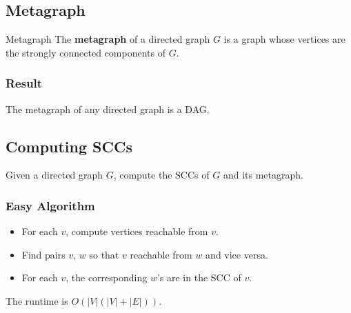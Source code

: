 \documentclass[letterpaper]{article}
\begin{document}
\subsection{Metagraph}
\begin{definition}{Metagraph}{}
    The \textbf{metagraph} of a directed graph $G$ is a graph whose vertices are the strongly connected components of $G$.
\end{definition}


\subsubsection{Result}
\begin{theorem}{}{}
    The metagraph of any directed graph is a DAG. 
\end{theorem}

\subsection{Computing SCCs}
Given a directed graph $G$, compute the SCCs of $G$ and its metagraph. 

\subsubsection{Easy Algorithm}
\begin{itemize}
    \item For each $v$, compute vertices reachable from $v$.
    \item Find pairs $v$, $w$ so that $v$ reachable from $w$ and vice versa.
    \item For each $v$, the corresponding $w$'s are in the SCC of $v$.
\end{itemize}
The runtime is $O(|V|(|V| + |E|))$.
\end{document}

